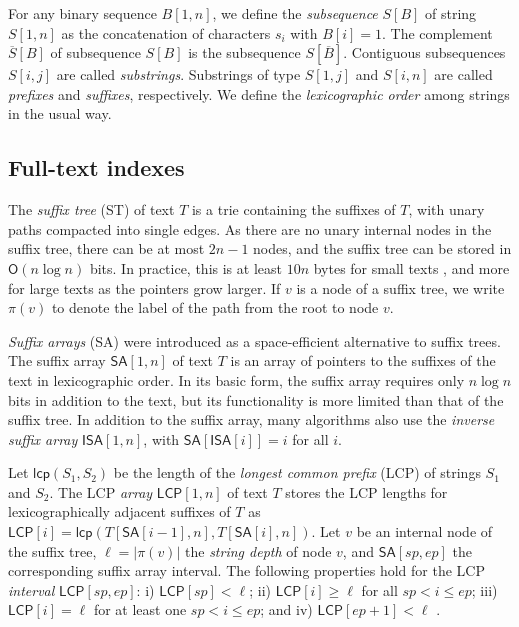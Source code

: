 \documentclass[a4paper,11pt]{llncs}
\newcommand{\abs}[1]{\ensuremath{\lvert #1 \rvert}}
\renewcommand{\complement}[1]{\ensuremath{\overline{ #1 }}}
\newcommand{\ST}{\textsf{ST}}
\newcommand{\SA}{\textsf{SA}}
\newcommand{\mSA}{\ensuremath{\mathsf{SA}}}
\newcommand{\mISA}{\ensuremath{\mathsf{ISA}}}
\newcommand{\LCP}{\textsf{LCP}}
\newcommand{\mLCP}{\ensuremath{\mathsf{LCP}}}
\newcommand{\mlcp}{\ensuremath{\mathsf{lcp}}}
\newcommand{\Oh}{\ensuremath{\mathsf{O}}}
\begin{document}
For any binary sequence $B[1,n]$, we define the \emph{subsequence} $S[B]$ of string $S[1,n]$ as the concatenation of characters $s_{i}$ with $B[i] = 1$. The complement $\complement{S}[B]$ of subsequence $S[B]$ is the subsequence $S[\complement{B}]$. Contiguous subsequences $S[i,j]$ are called \emph{substrings}. Substrings of type $S[1,j]$ and $S[i,n]$ are called \emph{prefixes} and \emph{suffixes}, respectively. We define the \emph{lexicographic order} among strings in the usual way.

\subsection{Full-text indexes}

The \emph{suffix tree} (\ST) \cite{Weiner1973} of text $T$ is a trie containing the suffixes of $T$, with unary paths compacted into single edges. As there are no unary internal nodes in the suffix tree, there can be at most $2n-1$ nodes, and the suffix tree can be stored in $\Oh(n \log n)$ bits. In practice, this is at least $10n$ bytes for small texts \cite{Kurtz1999}, and more for large texts as the pointers grow larger. If $v$ is a node of a suffix tree, we write $\pi(v)$ to denote the label of the path from the root to node $v$.

\emph{Suffix arrays} (\SA) \cite{Manber1993} were introduced as a space-efficient alternative to suffix trees. The suffix array $\mSA[1,n]$ of text $T$ is an array of pointers to the suffixes of the text in lexicographic order. In its basic form, the suffix array requires only $n \log n$ bits in addition to the text, but its functionality is more limited than that of the suffix tree. In addition to the suffix array, many algorithms also use the \emph{inverse suffix array} $\mISA[1,n]$, with $\mSA[\mISA[i]] = i$ for all $i$.

Let $\mlcp(S_{1}, S_{2})$ be the length of the \emph{longest common prefix} (\LCP) of strings $S_{1}$ and $S_{2}$. The \LCP{} \emph{array} \cite{Manber1993} $\mLCP[1,n]$ of text $T$ stores the \LCP{} lengths for lexicographically adjacent suffixes of $T$ as $\mLCP[i] = \mlcp(T[\mSA[i-1],n], T[\mSA[i],n])$. Let $v$ be an internal node of the suffix tree, $\ell = \abs{\pi(v)}$ the \emph{string depth} of node $v$, and $\mSA[sp,ep]$ the corresponding suffix array interval. The following properties hold for the \LCP{} \emph{interval} $\mLCP[sp,ep]$: i) $\mLCP[sp] < \ell$; ii) $\mLCP[i] \ge \ell$ for all $sp < i \le ep$; iii) $\mLCP[i] = \ell$ for at least one $sp < i \le ep$; and iv) $\mLCP[ep+1] < \ell$ \cite{Abouelhoda2004}.
\end{document}
